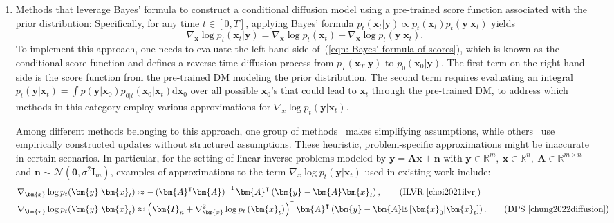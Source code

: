 \documentclass{article}
\numberwithin{equation}{section}
\def\eqref#1{(\ref{#1})}
\newcommand{\dif}{{\mathrm{d}}}
\def\vn{{\bm{n}}}
\def\vx{{\bm{x}}}
\def\vy{{\bm{y}}}
\def\mA{{\bm{A}}}
\def\mI{{\bm{I}}}
\def\gN{{\mathcal{N}}}
\begin{document}
\begin{enumerate}[leftmargin=15pt,itemsep=0pt,topsep=0pt]
    \item Methods that leverage Bayes' formula to construct a conditional diffusion model using a pre-trained score function associated with the prior distribution: Specifically, for any time $t \in [0,T]$, applying Bayes' formula $p_{t}(\vx_t|\vy) \propto p_{t}(\vx_t)p_t(\vy|\vx_t)$ yields
    \begin{equation}
    \label{eqn: Bayes' formula of scores}
    \nabla_\vx\log p_{t}(\vx_t|\vy) = \nabla_\vx \log p_t(\vx_t) + \nabla_\vx \log p_t(\vy|\vx_t).    
    \end{equation}
    To implement this approach, one needs to evaluate the left-hand side of~\eqref{eqn: Bayes' formula of scores}, which is known as the conditional score function and defines a reverse-time diffusion process from $p_{T}(\vx_T|\vy)$ to $p_0(\vx_0|\vy)$. The first term on the right-hand side is the score function from the pre-trained DM modeling the prior distribution. The second term requires evaluating an integral $p_t(\vy | \vx_t) = \int p(\vy|\vx_0)p_{0|t}(\vx_0 | \vx_t)\dif \vx_0$ over all possible $\vx_0$'s that could lead to $\vx_t$ through the pre-trained DM, to address which methods in this category employ various approximations for $\nabla_x \log p_t(\vy|\vx_t)$. 
    
    Among different methods belonging to this approach, one group of methods~\cite{song2020score, choi2021ilvr, song2021solving, chung2022diffusion, song2023pseudoinverse, boys2023tweedie, wu2023practical} makes simplifying assumptions, while others~\cite{choi2021ilvr, wang2022zero, kawar2022denoising, rout2023solving} use empirically constructed updates without structured assumptions. These heuristic, problem-specific approximations might be inaccurate in certain scenarios. In particular, for the setting of linear inverse problems modeled by $\vy = \mA\vx + \vn$ with $\vy \in \mathbb{R}^m, \ \vx \in \mathbb{R}^n, \ \mA \in \mathbb{R}^{m \times n }$ and $\vn \sim \gN(\boldsymbol{0},\sigma^2\mI_m)$, examples of approximations to the term $\nabla_x \log p_t(\vy|\vx_t)$ used in existing work include:
    \begin{align}
    \nabla_\vx \log p_t(\vy|\vx_t) &\approx -\left(\mA^\intercal \mA\right)^{-1}\mA^\intercal\left(\vy - \mA\vx_t\right), \tag{ILVR~\cite{choi2021ilvr}} \\
    \nabla_\vx \log p_t(\vy|\vx_t) &\approx \left(\mI_n + \nabla_{\vx}^2\log p_t\left(\vx_t\right)\right)^\intercal \mA^\intercal \left(\vy - \mA\mathbb{E}\left[\vx_0  |  \vx_t\right]\right). \tag{DPS~\cite{chung2022diffusion}}
    \end{align}
    

\end{enumerate}
\end{document}
